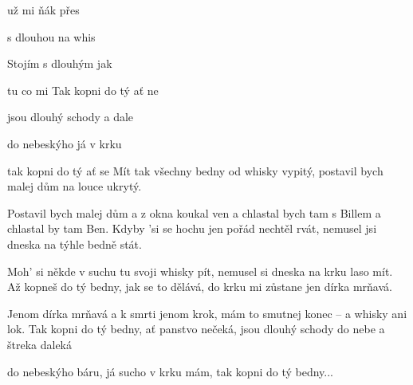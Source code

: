 
\zs
{} už mi  ňák  přes 

 s dlouhou  na   whis

Stojím s dlouhým  jak  

tu  co  mi        
\ks
\zr
Tak kopni do tý  ať  ne

jsou dlouhý schody  a  dale

do nebeskýho  já  v krku 

tak kopni do tý  ať  se  
\kr
\zs
Mít tak všechny bedny od whisky vypitý,
postavil bych malej dům na louce ukrytý.

Postavil bych malej dům a z okna koukal ven
a chlastal bych tam s Billem a chlastal by tam Ben.
\ks
\zr  \kr
\zs
Kdyby 'si se hochu jen pořád nechtěl rvát,
nemusel jsi dneska na týhle bedně stát.

Moh' si někde v suchu tu svoji whisky pít,
nemusel si dneska na krku laso mít.
\ks
\zr  \kr
\zs
Až kopneš do tý bedny, jak se to dělává,
do krku mi zůstane jen dírka mrňavá.

Jenom dírka mrňavá a k smrti jenom krok,
mám to smutnej konec -- a whisky ani lok.
\ks
\zr
Tak kopni do tý bedny, ať panstvo nečeká,
jsou dlouhý schody do nebe a štreka daleká

do nebeskýho báru, já sucho v krku mám,
tak kopni do tý bedny...
\kr

\kp






















